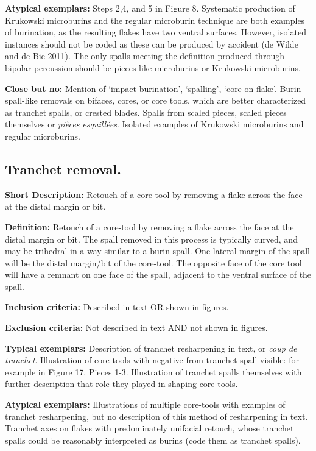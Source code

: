 \documentclass[
]{article}
\begin{document}
\textbf{Atypical exemplars:} Steps 2,4, and 5 in Figure 8. Systematic
production of Krukowski microburins and the regular microburin technique
are both examples of burination, as the resulting flakes have two
ventral surfaces. However, isolated instances should not be coded as
these can be produced by accident (de Wilde and de Bie 2011). The only
spalls meeting the definition produced through bipolar percussion should
be pieces like microburins or Krukowski microburins.

\textbf{Close but no:} Mention of `impact burination', `spalling',
`core-on-flake'. Burin spall-like removals on bifaces, cores, or core
tools, which are better characterized as tranchet spalls, or crested
blades. Spalls from scaled pieces, scaled pieces themselves or
\emph{pièces esquillées}. Isolated examples of Krukowski microburins and
regular microburins.

\hypertarget{tranchet-removal.}{%
\subsection{Tranchet removal.}\label{tranchet-removal.}}

\textbf{Short Description:} Retouch of a core-tool by removing a flake
across the face at the distal margin or bit.

\textbf{Definition:} Retouch of a core-tool by removing a flake across
the face at the distal margin or bit. The spall removed in this process
is typically curved, and may be trihedral in a way similar to a burin
spall. One lateral margin of the spall will be the distal margin/bit of
the core-tool. The opposite face of the core tool will have a remnant on
one face of the spall, adjacent to the ventral surface of the spall.

\textbf{Inclusion criteria:} Described in text OR shown in figures.

\textbf{Exclusion criteria:} Not described in text AND not shown in
figures.

\textbf{Typical exemplars:} Description of tranchet resharpening in
text, or \emph{coup de tranchet}. Illustration of core-tools with
negative from tranchet spall visible: for example in Figure 17. Pieces
1-3. Illustration of tranchet spalls themselves with further description
that role they played in shaping core tools.

\textbf{Atypical exemplars:} Illustrations of multiple core-tools with
examples of tranchet resharpening, but no description of this method of
resharpening in text. Tranchet axes on flakes with predominately
unifacial retouch, whose tranchet spalls could be reasonably interpreted
as burins (code them as tranchet spalls).
\end{document}
